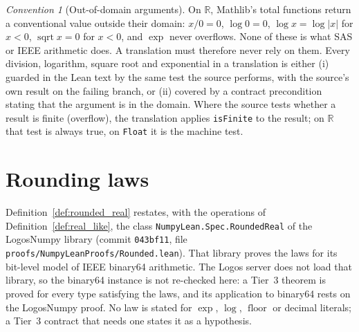 \documentclass[11pt,a4paper]{article}
\theoremstyle{definition}
\theoremstyle{plain}
\theoremstyle{remark}
\newtheorem{convention}{Convention}
\newcommand{\R}{\mathbb{R}}
\newcommand{\code}[1]{\texttt{#1}}
\begin{document}
\begin{convention}[Out-of-domain arguments]\label{conv:domain}
On $\R$, Mathlib's total functions return a conventional value outside their domain:
$x / 0 = 0$, $\log 0 = 0$, $\log x = \log |x|$ for $x < 0$, $\operatorname{sqrt} x = 0$ for
$x < 0$, and $\exp$ never overflows. None of these is what SAS or IEEE arithmetic does. A
translation must therefore never rely on them. Every division, logarithm, square root and
exponential in a translation is either (i) guarded in the Lean text by the same test the
source performs, with the source's own result on the failing branch, or (ii) covered by a
contract precondition stating that the argument is in the domain. Where the source tests
whether a result is finite (overflow), the translation applies \code{isFinite} to the result;
on $\R$ that test is always true, on \code{Float} it is the machine test.
\end{convention}

\section{Rounding laws}

Definition~\ref{def:rounded_real} restates, with the operations of
Definition~\ref{def:real_like}, the class \code{NumpyLean.Spec.RoundedReal} of the LogosNumpy
library (commit \code{043bf11}, file \code{proofs/NumpyLeanProofs/Rounded.lean}). That library
proves the laws for its bit-level model of IEEE binary64 arithmetic. The Logos server does not
load that library, so the binary64 instance is not re-checked here: a Tier~3 theorem is proved
for every type satisfying the laws, and its application to binary64 rests on the LogosNumpy
proof. No law is stated for $\exp$, $\log$, $\operatorname{floor}$ or decimal literals; a
Tier~3 contract that needs one states it as a hypothesis.
\end{document}
